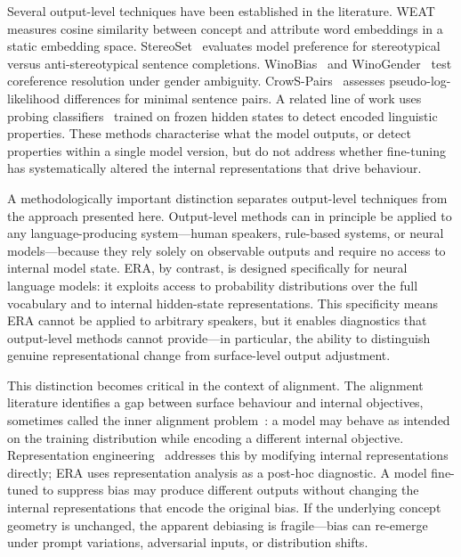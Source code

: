 \documentclass[11pt,a4paper]{article}
\begin{document}
Several output-level techniques have been established in the literature. WEAT~\cite{caliskan2017}
measures cosine similarity between concept and attribute word embeddings in a static
embedding space. StereoSet~\cite{nadeem2021} evaluates model preference for stereotypical
versus anti-stereotypical sentence completions. WinoBias~\cite{zhao2018} and
WinoGender~\cite{rudinger2018} test coreference resolution under gender ambiguity.
CrowS-Pairs~\cite{nangia2021} assesses pseudo-log-likelihood differences for minimal
sentence pairs. A related line of work uses probing classifiers~\cite{belinkov2019,tenney2019}
trained on frozen hidden states to detect encoded linguistic properties. These methods
characterise what the model outputs, or detect properties within a single model version,
but do not address whether fine-tuning has systematically altered the internal
representations that drive behaviour.

A methodologically important distinction separates output-level techniques from the
approach presented here. Output-level methods can in principle be applied to any
language-producing system---human speakers, rule-based systems, or neural models---because
they rely solely on observable outputs and require no access to internal model state.
ERA, by contrast, is designed specifically for neural language models: it exploits
access to probability distributions over the full vocabulary and to internal hidden-state
representations. This specificity means ERA cannot be applied to arbitrary speakers,
but it enables diagnostics that output-level methods cannot provide---in particular,
the ability to distinguish genuine representational change from surface-level output
adjustment.

This distinction becomes critical in the context of alignment. The alignment literature
identifies a gap between surface behaviour and internal objectives, sometimes called
the inner alignment problem~\cite{hubinger2019}: a model may behave as intended on the
training distribution while encoding a different internal objective. Representation
engineering~\cite{zou2023} addresses this by modifying internal representations directly;
ERA uses representation analysis as a post-hoc diagnostic. A model fine-tuned to suppress
bias may produce different outputs without changing the internal representations that
encode the original bias. If the underlying concept geometry is unchanged, the apparent
debiasing is fragile---bias can re-emerge under prompt variations, adversarial inputs,
or distribution shifts.
\end{document}
